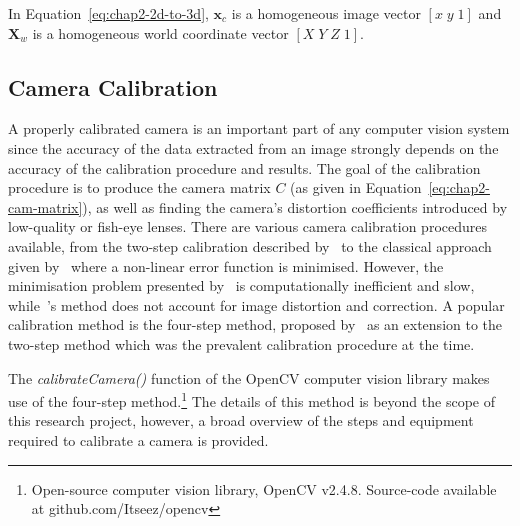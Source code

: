 In Equation~\ref{eq:chap2-2d-to-3d}, $\bm{x}_c$ is a homogeneous image vector $[x\;y\;1]$ and $\bm{X}_w$ is a homogeneous world coordinate vector $[X\;Y\;Z\;1]$. 

\subsection{Camera Calibration}
\label{sec:chap2-cam-calibration}

A properly calibrated camera is an important part of any computer vision system since the accuracy of the data extracted from an image strongly depends on the accuracy of the calibration procedure and results. The goal of the calibration procedure is to produce the camera matrix $C$ (as given in Equation~\ref{eq:chap2-cam-matrix}), as well as finding the camera's distortion coefficients introduced by low-quality or fish-eye lenses. There are various camera calibration procedures available, from the two-step calibration described by~\cite{melen1994geometrical} to the classical approach given by~\cite{slama1980manual} where a non-linear error function is minimised. However, the minimisation problem presented by~\citeauthor{slama1980manual} is computationally inefficient and slow, while~\citeauthor{melen1994geometrical}'s method does not account for image distortion and correction. A popular calibration method is the four-step method, proposed by~\cite{heikkila1997four} as an extension to the two-step method which was the prevalent calibration procedure at the time.

The \emph{calibrateCamera()} function of the OpenCV computer vision library \citep{bradski2000opencv} makes use of the four-step method.\footnote{Open-source computer vision library, OpenCV v2.4.8. Source-code available at github.com/Itseez/opencv} The details of this method is beyond the scope of this research project, however, a broad overview of the steps and equipment required to calibrate a camera is provided. 

